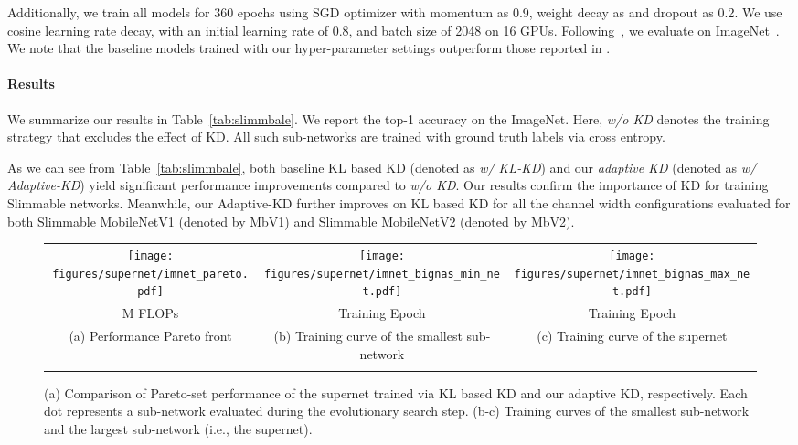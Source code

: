\documentclass{article}
\begin{document}
Additionally, we train all models for 360 epochs using SGD optimizer with momentum as 0.9, weight decay as  and dropout as 0.2. 
We use cosine learning rate decay, with an initial learning rate of 0.8, and batch size of 2048 on 16 GPUs.  
Following~\citet{yu2019universally}, we evaluate on ImageNet~\citep{deng2009imagenet}. 
We note that the baseline models trained with our hyper-parameter settings 
outperform those reported in \citet{yu2019universally}. 


\paragraph{Results} 
We summarize our results in Table~\ref{tab:slimmbale}. 
We report the top-1 accuracy on the ImageNet.
Here, \emph{w/o KD} denotes the training strategy that excludes the effect of KD.  All such sub-networks are trained with ground truth labels via cross entropy. 

As we can see from Table~\ref{tab:slimmbale}, 
both baseline KL based KD (denoted as \emph{w/ KL-KD}) and our \emph{adaptive KD} (denoted as \emph{w/ Adaptive-KD}) yield significant performance improvements compared to \emph{w/o KD}. 
Our results confirm the importance of KD for training Slimmable networks. 
Meanwhile, our Adaptive-KD further improves on KL based KD for all the channel width configurations evaluated for both Slimmable MobileNetV1 (denoted by MbV1) and Slimmable MobileNetV2 (denoted by MbV2). 


\begin{figure*}[t]
\centering
\setlength{\tabcolsep}{2pt}
\begin{tabular}{ccc}
\raisebox{1.5em}{\rotatebox{90}{\small Top-1 validation accuracy}}
\texttt{[image: figures/supernet/imnet\_pareto.pdf]} &
\texttt{[image: figures/supernet/imnet\_bignas\_min\_net.pdf]} &
\texttt{[image: figures/supernet/imnet\_bignas\_max\_net.pdf]} \\
\small  M FLOPs & \small Training Epoch & \small  Training Epoch \\
\small (a) Performance Pareto front & \small (b) Training curve of the smallest sub-network & \small (c) Training curve of the supernet \\ 
\vspace{-1.0em}
\end{tabular}
\caption{(a) Comparison of Pareto-set performance of the supernet trained via KL based KD and our adaptive KD, respectively. Each dot represents a sub-network evaluated during the evolutionary search step. 
(b-c) Training curves of the smallest sub-network and the largest sub-network (i.e., the supernet). }
\vspace{-1em}
\label{fig:supernet_pareto_and_training}
\end{figure*}
\end{document}
